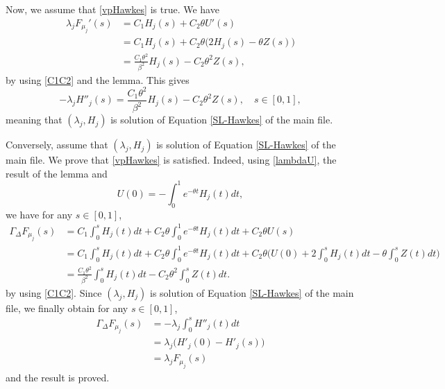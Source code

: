 \documentclass[aos]{imsart}
\theoremstyle{plain}
\theoremstyle{remark}
\newcommand{\1}{1}
\begin{document}
Now, we assume that \eqref{vpHawkes} is true. We have
\begin{align*}
\lambda_jF_{\mu_j}'(s)&=C_1H_j(s)+C_2\theta U'(s)\\
&=C_1H_j(s)+C_2\theta\Big(2H_j(s)-\theta Z(s)\Big)\\
&=\frac{C_1\theta^2}{\beta^2}H_j(s)-C_2\theta^2 Z(s),
\end{align*}
by using \eqref{C1C2} and the lemma.
This gives
\begin{equation}\label{F-W}
-\lambda_j H''_j(s)=\frac{C_1\theta^2}{\beta^2}H_j(s)-C_2\theta^2 Z(s), \quad s\in [0,1],
\end{equation}
meaning that $(\lambda_j,H_j)$ is solution of Equation \eqref{SL-Hawkes} of the main file.

\bigskip

Conversely, assume that $(\lambda_j,H_j)$ is solution of Equation \eqref{SL-Hawkes} of the main file. We prove  that \eqref{vpHawkes} is satisfied. Indeed, using \eqref{lambdaU}, the result of the lemma and
\[
U(0)=-\int_0^1e^{-\theta t}H_j(t)dt,
\]
 we have for any $s\in[0,1]$,
\begin{align*}
\Gamma_\Delta F_{\mu_j}(s)&= C_1\int_0^sH_j(t)dt+C_2\theta\int_0^1e^{-\theta t}H_j(t)dt+C_2\theta U(s)\\
&=C_1\int_0^sH_j(t)dt+C_2\theta\int_0^1e^{-\theta t}H_j(t)dt+C_2\theta\Big(U(0)+2\int_0^sH_j(t)dt-\theta\int_0^sZ(t)dt\Big)\\
&=\frac{C_1\theta^2}{\beta^2}\int_0^sH_j(t)dt-C_2\theta^2\int_0^sZ(t)dt.
\end{align*}
by using \eqref{C1C2}. Since $(\lambda_j,H_j)$ is solution of Equation \eqref{SL-Hawkes} of the main file, we finally obtain for any $s\in[0,1]$,
\begin{align*}
\Gamma_\Delta F_{\mu_j}(s)&= -\lambda_j\int_0^s H''_j(t)dt\\
&=\lambda_j\big(H'_j(0)-H'_j(s)\big)\\
&=\lambda_j F_{\mu_j}(s)
\end{align*}
and the result is proved.

\bigskip
\end{document}
